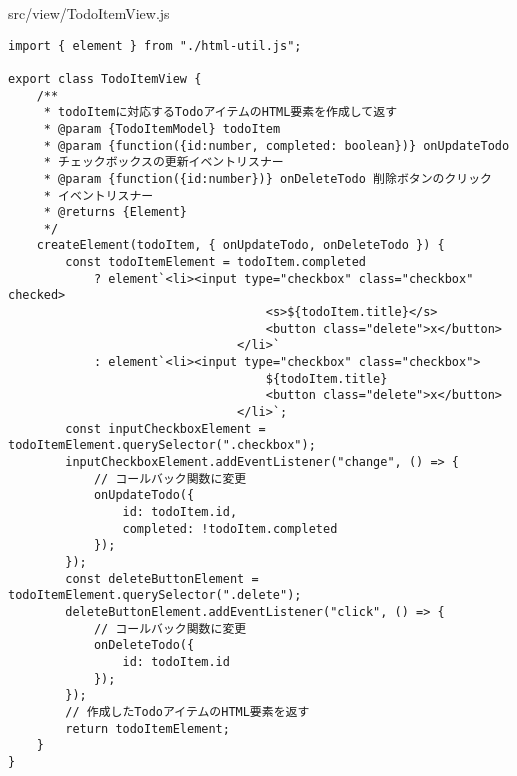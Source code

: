 \begin{listtitle}
src/view/TodoItemView.js
\end{listtitle}
\begin{lstlisting}
import { element } from "./html-util.js";

export class TodoItemView {
    /**
     * todoItemに対応するTodoアイテムのHTML要素を作成して返す
     * @param {TodoItemModel} todoItem
     * @param {function({id:number, completed: boolean})} onUpdateTodo
     * チェックボックスの更新イベントリスナー
     * @param {function({id:number})} onDeleteTodo 削除ボタンのクリック
     * イベントリスナー
     * @returns {Element}
     */
    createElement(todoItem, { onUpdateTodo, onDeleteTodo }) {
        const todoItemElement = todoItem.completed
            ? element`<li><input type="checkbox" class="checkbox" checked>
                                    <s>${todoItem.title}</s>
                                    <button class="delete">x</button>
                                </li>`
            : element`<li><input type="checkbox" class="checkbox">
                                    ${todoItem.title}
                                    <button class="delete">x</button>
                                </li>`;
        const inputCheckboxElement = todoItemElement.querySelector(".checkbox");
        inputCheckboxElement.addEventListener("change", () => {
            // コールバック関数に変更
            onUpdateTodo({
                id: todoItem.id,
                completed: !todoItem.completed
            });
        });
        const deleteButtonElement = todoItemElement.querySelector(".delete");
        deleteButtonElement.addEventListener("click", () => {
            // コールバック関数に変更
            onDeleteTodo({
                id: todoItem.id
            });
        });
        // 作成したTodoアイテムのHTML要素を返す
        return todoItemElement;
    }
}
\end{lstlisting}
\listend
